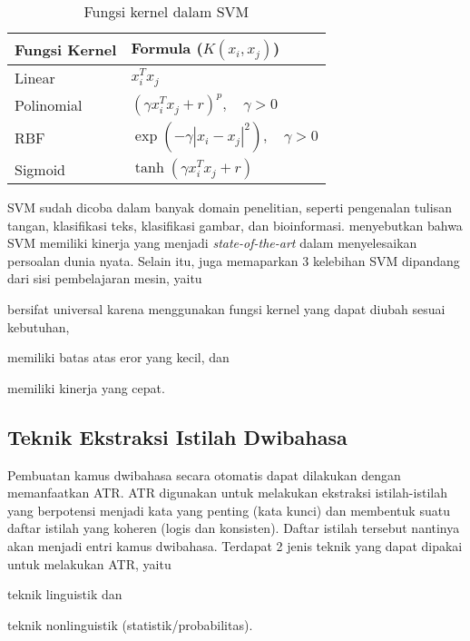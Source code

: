 \documentclass[../main/main.tex]{subfiles}
\begin{document}
\begin{table}[htbp]
	\centering
	\caption{Fungsi kernel dalam SVM}
	\label{tbl:studi_kernel}
	\begin{tabular}{|p{}|p{}|}
		\hline
		\textbf{Fungsi Kernel} & \textbf{Formula ($K(x_i, x_j)$)}\\ \hline
		Linear & $x_i^T x_j$\\ \hline
		Polinomial & $\left( \gamma x_i^T x_j + r \right)^p, \quad \gamma > 0$\\ \hline
		RBF & $\exp\left( -\gamma \left| x_i - x_j \right|^2 \right), \quad \gamma > 0$\\ \hline
		Sigmoid & $\tanh\left( \gamma x_i^T x_j + r \right)$\\ \hline
	\end{tabular}
\end{table}

SVM sudah dicoba dalam banyak domain penelitian, seperti pengenalan tulisan tangan, klasifikasi teks, klasifikasi gambar, dan bioinformasi. \textcite{christianini} menyebutkan bahwa SVM memiliki kinerja yang menjadi \textit{state-of-the-art} dalam menyelesaikan persoalan dunia nyata. Selain itu, \textcite{vapnik} juga memaparkan 3 kelebihan SVM dipandang dari sisi pembelajaran mesin, yaitu
\begin{inparaenum}[(1)]
\item bersifat universal karena menggunakan fungsi kernel yang dapat diubah sesuai kebutuhan,
\item memiliki batas atas eror yang kecil, dan
\item memiliki kinerja yang cepat.
\end{inparaenum}

\subsection{Teknik Ekstraksi Istilah Dwibahasa}
Pembuatan kamus dwibahasa secara otomatis dapat dilakukan dengan memanfaatkan ATR. ATR digunakan untuk melakukan ekstraksi istilah-istilah yang berpotensi menjadi kata yang penting (kata kunci) dan membentuk suatu daftar istilah yang koheren (logis dan konsisten). Daftar istilah tersebut nantinya akan menjadi entri kamus dwibahasa. Terdapat 2 jenis teknik yang dapat dipakai untuk melakukan ATR, yaitu \parencite{ananiadou}
\begin{inparaenum}[(1)]
\item teknik linguistik dan
\item teknik nonlinguistik (statistik/probabilitas).
\end{inparaenum}
\end{document}
